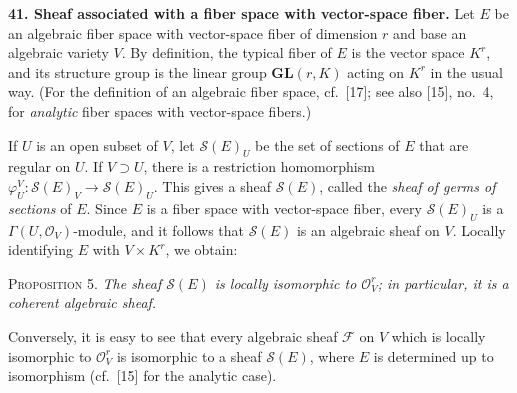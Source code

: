 
\medskip
{}\label{fac:II:2:no:41}
\textbf{41. Sheaf associated with a fiber space with vector-space fiber.}
Let $E$ be an algebraic fiber space with vector-space fiber of dimension $r$ and base an algebraic variety $V$. By definition, the typical fiber of $E$ is the vector space $K^r$, and its structure group is the linear group $\mathbf{GL}(r,K)$ acting on $K^r$ in the usual way. (For the definition of an algebraic fiber space, cf.~[17]; see also [15], no.~4, for \textit{analytic} fiber spaces with vector-space fibers.)

\label{fac:II:2:no:41:def:sheaf-of-germs-of-sections}
If $U$ is an open subset of $V$, let $\mathcal{S}(E)_U$ be the set of sections of $E$ that are regular on $U$. If $V\supset U$, there is a restriction homomorphism $\varphi_U^V:\mathcal{S}(E)_V\to\mathcal{S}(E)_U$. This gives a sheaf $\mathcal{S}(E)$, called the \textit{sheaf of germs of sections} of $E$. Since $E$ is a fiber space with vector-space fiber, every $\mathcal{S}(E)_U$ is a $\Gamma(U,\mathcal{O}_V)$-module, and it follows that $\mathcal{S}(E)$ is an algebraic sheaf on $V$. Locally identifying $E$ with $V\times K^r$, we obtain:

\label{fac:II:2:no:41:prop:5}
\textsc{Proposition 5.} \textit{The sheaf $\mathcal{S}(E)$ is locally isomorphic to $\mathcal{O}_V^r$; in particular, it is a coherent algebraic sheaf.}

Conversely, it is easy to see that every algebraic sheaf $\mathcal{F}$ on $V$ which is locally isomorphic to $\mathcal{O}_V^r$ is isomorphic to a sheaf $\mathcal{S}(E)$, where $E$ is determined up to isomorphism (cf.~[15] for the analytic case).


